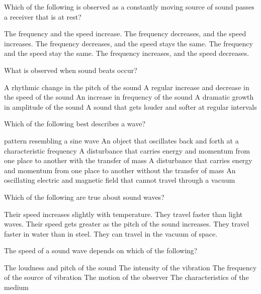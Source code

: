 \documentclass{../../../oss-ap12ibhl}
\begin{document}
\begin{questions}
  \question Which of the following is observed as a constantly moving source of
  sound passes a receiver that is at rest?
  \begin{choices}
    \choice The frequency and the speed increase.
    \choice The frequency decreases, and the speed increases.
    \choice The frequency decreases, and the speed stays the same.
    \choice The frequency and the speed stay the same.
    \choice The frequency increases, and the speed decreases.
  \end{choices}
    
  \question What is observed when sound beats occur?
  \begin{choices}
    \choice A rhythmic change in the pitch of the sound
    \choice A regular increase and decrease in the speed of the sound
    \choice An increase in frequency of the sound
    \choice A dramatic growth in amplitude of the sound
    \choice A sound that gets louder and softer at regular intervals
    \end{choices}
    
  \question Which of the following best describes a wave?
  \begin{choices}
    \choice pattern resembling a sine wave
    \choice An object that oscillates back and forth at a characteristic
    frequency
    \choice A disturbance that carries energy and momentum from one place to
    another with the transfer of mass
    \choice A disturbance that carries energy and momentum from one place to
    another without the transfer of mass
    \choice An oscillating electric and magnetic field that cannot travel
    through a vacuum
  \end{choices}
    
  \question Which of the following are true about sound waves?
  \label{multi-1st}
  \begin{choices}
    \choice Their speed increases slightly with temperature.
    \choice They travel faster than light waves.
    \choice Their speed gets greater as the pitch of the sound increases.
    \choice They travel faster in water than in steel.
    \choice They can travel in the vacuum of space.
  \end{choices}
    
  \question The speed of a sound wave depends on which of the following?
  \begin{choices}
    \choice The loudness and pitch of the sound
    \choice The intensity of the vibration
    \choice The frequency of the source of vibration
    \choice The motion of the observer
    \choice The characteristics of the medium
  \end{choices}
    

\end{questions}
\end{document}
